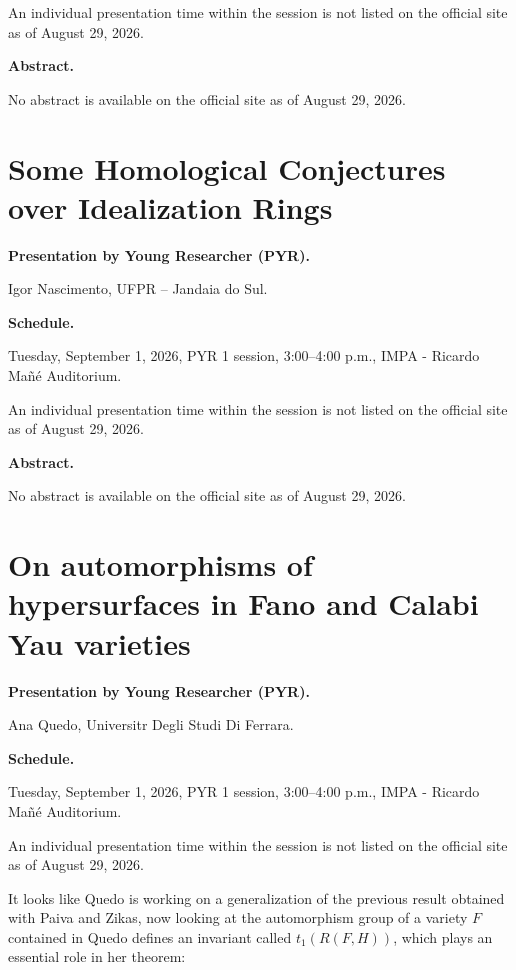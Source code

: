 An individual presentation time within
the session is not listed on the
official site as of August 29, 2026.

\medskip\noindent
{\bf Abstract.}

No abstract is available on the official
site as of August 29, 2026.

\section{Some Homological Conjectures over
Idealization Rings}
\label{section-homological-conjectures-rings}

\medskip\noindent
{\bf Presentation by Young Researcher
(PYR).}

Igor Nascimento,
UFPR -- Jandaia do Sul.

\medskip\noindent
{\bf Schedule.}

Tuesday, September 1, 2026,
PYR 1 session, 3:00--4:00 p.m.,
IMPA - Ricardo Ma\~n\'e Auditorium.

An individual presentation time within
the session is not listed on the
official site as of August 29, 2026.

\medskip\noindent
{\bf Abstract.}

No abstract is available on the official
site as of August 29, 2026.

\section{On automorphisms of hypersurfaces
in Fano and Calabi Yau varieties}
\label{section-automorphisms-hypersurfaces}

\medskip\noindent
{\bf Presentation by Young Researcher
(PYR).}

Ana Quedo,
Universitr Degli Studi Di Ferrara.

\medskip\noindent
{\bf Schedule.}

Tuesday, September 1, 2026,
PYR 1 session, 3:00--4:00 p.m.,
IMPA - Ricardo Ma\~n\'e Auditorium.

An individual presentation time within
the session is not listed on the
official site as of August 29, 2026.

\medskip\noindent
It looks like Quedo is working on a
generalization of the previous result
obtained with Paiva and Zikas,
now looking at the automorphism
group of a variety $F$ contained in 
Quedo defines an invariant called
$t_1(R(F,H))$, which plays an essential role
in her theorem:

